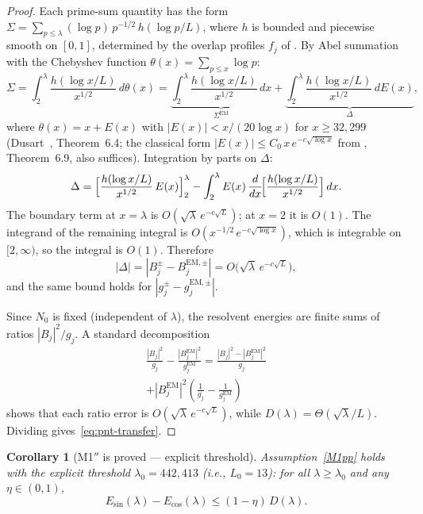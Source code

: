 \documentclass[12pt,a4paper]{article}
\newtheorem{corollary}[theorem]{Corollary}
\theoremstyle{definition}
\theoremstyle{remark}
\begin{document}
\begin{proof}
Each prime-sum quantity has the form $\Sigma = \sum_{p \leq \lambda} (\log p)\,p^{-1/2}\,h(\log p/L)$, where $h$ is bounded and piecewise smooth on $[0,1]$, determined by the overlap profiles $f_j$ of . By Abel summation with the Chebyshev function $\theta(x) = \sum_{p \leq x} \log p$:
\[
  \Sigma = \int_2^{\lambda} \frac{h(\log x/L)}{x^{1/2}}\,d\theta(x)
  = \underbrace{\int_2^{\lambda} \frac{h(\log x/L)}{x^{1/2}}\,dx}_{\Sigma^{\mathrm{EM}}}
  + \underbrace{\int_2^{\lambda} \frac{h(\log x/L)}{x^{1/2}}\,dE(x)}_{\Delta},
\]
where $\theta(x) = x + E(x)$ with $|E(x)| < x/(20\log x)$ for $x \geq 32{,}299$ (Dusart~\cite{Dusart2010}, Theorem~6.4; the classical form $|E(x)| \leq C_0\,x\,e^{-c\sqrt{\log x}}$ from \cite{IwaniecKowalski2004}, Theorem~6.9, also suffices). Integration by parts on $\Delta$:
\[
  \Delta = \Bigl[\frac{h(\log x/L)}{x^{1/2}}\,E(x)\Bigr]_2^{\lambda}
  - \int_2^{\lambda} E(x)\,\frac{d}{dx}\!\Bigl[\frac{h(\log x/L)}{x^{1/2}}\Bigr]\,dx.
\]
The boundary term at $x = \lambda$ is $O(\sqrt{\lambda}\,e^{-c\sqrt{L}})$; at $x = 2$ it is $O(1)$. The integrand of the remaining integral is $O(x^{-1/2}\,e^{-c\sqrt{\log x}})$, which is integrable on $[2,\infty)$, so the integral is $O(1)$. Therefore
\begin{equation}
\label{eq:pnt-error}
  |\Delta| = |B_j^{\pm} - B_j^{\mathrm{EM},\pm}| = O\!\bigl(\sqrt{\lambda}\,e^{-c\sqrt{L}}\bigr),
\end{equation}
and the same bound holds for $|g_j^{\pm} - g_j^{\mathrm{EM},\pm}|$.

Since $N_0$ is fixed (independent of $\lambda$), the resolvent energies are finite sums of ratios $|B_j|^2/g_j$. A standard decomposition
\begin{multline*}
  \frac{|B_j|^2}{g_j} - \frac{|B_j^{\mathrm{EM}}|^2}{g_j^{\mathrm{EM}}}
  = \frac{|B_j|^2 - |B_j^{\mathrm{EM}}|^2}{g_j} \\
  + |B_j^{\mathrm{EM}}|^2\!\left(\frac{1}{g_j} - \frac{1}{g_j^{\mathrm{EM}}}\right)
\end{multline*}
shows that each ratio error is $O(\sqrt{\lambda}\,e^{-c\sqrt{L}})$, while $D(\lambda) = \Theta(\sqrt{\lambda}/L)$. Dividing gives~\eqref{eq:pnt-transfer}.
\end{proof}

\begin{corollary}[M1$''$ is proved --- explicit threshold]
\label{cor:M1-proved}
Assumption~\ref{M1pp} holds with the explicit threshold $\lambda_0 = 442{,}413$ (i.e., $L_0 = 13$): for all $\lambda \geq \lambda_0$ and any $\eta \in (0,1)$,
\[
  E_{\sin}(\lambda) - E_{\cos}(\lambda) \leq (1-\eta)\,D(\lambda).
\]
\end{corollary}
\end{document}
